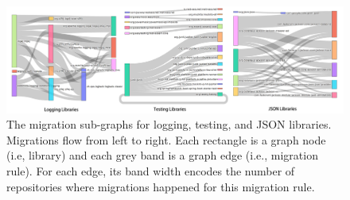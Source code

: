 \documentclass[sigconf, screen]{acmart}
\begin{document}

\begin{figure}[t]
  \centering
  \includegraphics[width=\linewidth]{fig/graph.png}
  \vspace{-6mm}
  \caption{The migration sub-graphs for logging, testing, and JSON libraries. Migrations flow from left to right. Each rectangle is a graph node (i.e, library) and each grey band is a graph edge (i.e., migration rule). %
  For each edge, its band width encodes the number of repositories where migrations happened for this migration rule.
  }
  \label{fig:miggraph}
  \vspace{-2mm}
\end{figure}
\end{document}
